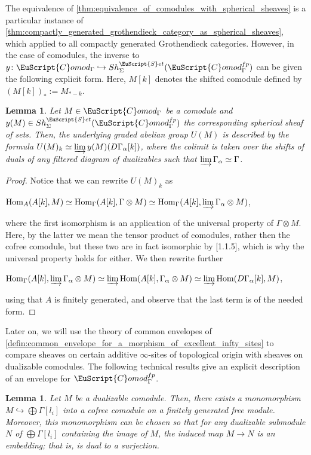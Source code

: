 \documentclass[oneside,a4paper]{amsart}
\newcommand{\euscr}[1]{\EuScript{#1}} %
\newcommand{\Hom}{\textnormal{Hom}} %
\newcommand{\sets}{\euscr{S}et} %
\newcommand{\Comod}{\euscr{C}omod} %
\newcommand{\ComodGamma}{\Comod_{\Gamma}} %
\theoremstyle{plain}
\newtheorem{lemma}[thm]{Lemma}
\theoremstyle{definition}
\theoremstyle{remark}
\begin{document}
The equivalence of \cref{thm:equivalence_of_comodules_with_spherical_sheaves} is a particular instance of \cref{thm:compactly_generated_grothendieck_category_as_spherical_sheaves}, which applied to all compactly generated Grothendieck categories. However, in the case of comodules, the inverse to $y \colon \ComodGamma \hookrightarrow Sh_{\Sigma}^{\sets}(\ComodGamma^{fp})$ can be given the following explicit form. Here, $M[k]$ denotes the shifted comodule defined by $(M[k])_{*} := M_{*-k}$. 

\begin{lemma}
\label{lemma:recovering_comodules_from_sheaves}
Let $M \in \ComodGamma$ be a comodule and $y(M) \in Sh_{\Sigma}^{\sets}(\ComodGamma^{fp})$ the corresponding spherical sheaf of sets. Then, the underlying graded abelian group $U(M)$ is described by the formula $U(M)_{k} \simeq \varinjlim y(M)(D\Gamma_{\alpha}[k])$, where the colimit is taken over the shifts of duals of any filtered diagram of dualizables such that $\varinjlim \Gamma _{\alpha} \simeq \Gamma$.
\end{lemma}

\begin{proof}
Notice that we can rewrite $U(M)_{k}$ as 

\begin{center}
$\Hom_{A}(A[k], M) \simeq \Hom_{\Gamma}(A[k], \Gamma \otimes M) \simeq \Hom_{\Gamma}(A[k], \varinjlim \Gamma_{\alpha} \otimes M)$,
\end{center}
where the first isomorphism is an application of the universal property of $\Gamma \otimes M$. Here, by the latter we mean the tensor product of comodules, rather then the cofree comodule, but these two are in fact isomorphic by \cite{hovey2003homotopy}[1.1.5], which is why the universal property holds for either. We then rewrite further

\begin{center}
$\Hom_{\Gamma}(A[k], \varinjlim \Gamma_{\alpha} \otimes M) \simeq \varinjlim \Hom(A[k], \Gamma_{\alpha} \otimes M) \simeq \varinjlim \Hom(D\Gamma_{\alpha}[k], M)$,
\end{center}
using that $A$ is finitely generated, and observe that the last term is of the needed form. 
\end{proof}

Later on, we will use the theory of common envelopes of \cref{defin:common_envelope_for_a_morphism_of_excellent_infty_sites} to compare sheaves on certain additive $\infty$-sites of topological origin with sheaves on dualizable comodules. The following technical results give an explicit description of an envelope for $\ComodGamma^{fp}$. 
\begin{lemma}
\label{lemma:dualizable_comodule_embeds_into_a_cofree_one}
Let $M$ be a dualizable comodule. Then, there exists a monomorphism $M \hookrightarrow \bigoplus \Gamma[l_{i}]$ into a cofree comodule on a finitely generated free module. Moreover, this monomorphism can be chosen so that for any dualizable submodule $N$ of $\bigoplus \Gamma[l_{i}]$ containing the image of $M$, the induced map $M \rightarrow N$ is an embedding; that is, is dual to a surjection.
\end{lemma}
\end{document}
